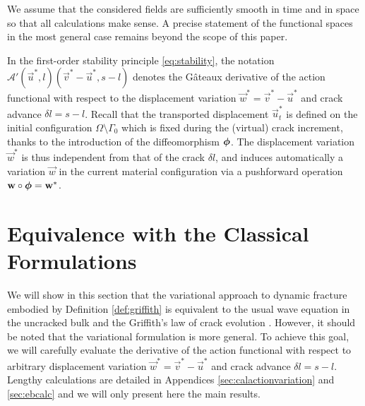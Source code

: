 \begin{remark}
We assume that the considered fields are sufficiently smooth in time and in space so that all calculations make sense. A precise statement of the functional spaces in the most general case remains beyond the scope of this paper.
\end{remark}

In the first-order stability principle \eqref{eq:stability}, the notation $\mathcal{A}'(\vec{u}^*,l)(\vec{v}^*-\vec{u}^*,s-l)$ denotes the Gâteaux derivative of the action functional with respect to the displacement variation $\vec{w}^*=\vec{v}^*-\vec{u}^*$ and crack advance $\delta l=s-l$. Recall that the transported displacement $\vec{u}_t^*$ is defined on the initial configuration $\Omega\setminus\Gamma_0$ which is fixed during the (virtual) crack increment, thanks to the introduction of the diffeomorphism $\philt$. The displacement variation $\vec{w}^*$ is thus independent from that of the crack $\delta l$, and induces automatically a variation $\vec{w}$ in the current material configuration via a pushforward operation $\vec{w}\circ\philt=\vec{w}^*$.

\section{Equivalence with the Classical Formulations}
We will show in this section that the variational approach to dynamic fracture embodied by Definition \ref{def:griffith} is equivalent to the usual wave equation in the uncracked bulk and the Griffith's law of crack evolution \cite{Freund:1990}. However, it should be noted that the variational formulation is more general. To achieve this goal, we will carefully evaluate the derivative of the action functional with respect to arbitrary displacement variation $\vec{w}^*=\vec{v}^*-\vec{u}^*$ and crack advance $\delta l=s-l$. Lengthy calculations are detailed in Appendices \ref{sec:calactionvariation} and \ref{sec:ebcalc} and we will only present here the main results.

